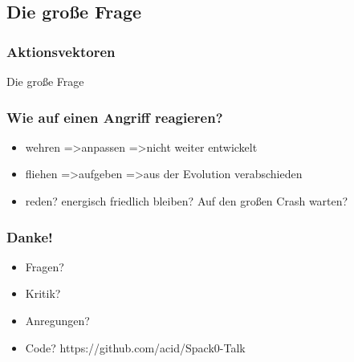 \documentclass{beamer}
\begin{document}
\subsection{Die große Frage}

\frame
{
  \frametitle{Aktionsvektoren}
  Die große Frage
}
\frame
{
  \frametitle{Wie auf einen Angriff reagieren?}
  
  \begin{itemize}[<+->]
  \item wehren =\textgreater anpassen =\textgreater   nicht weiter entwickelt
  \item fliehen =\textgreater  aufgeben =\textgreater  aus der Evolution verabschieden
  \item reden? energisch friedlich bleiben? Auf den großen Crash warten?
  \end{itemize}

}
\frame
{
  \frametitle{Danke!}
  
  \begin{itemize}
  \item Fragen?
  \item Kritik?
  \item Anregungen?
  \item Code? https://github.com/acid/Spack0-Talk
  \end{itemize}

}
\end{document}
